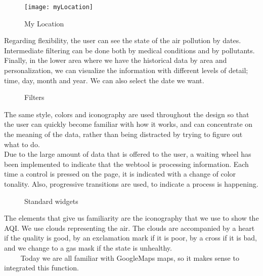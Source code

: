 \begin{figure}[ht]
    \centering
    \texttt{[image: myLocation]}
    \caption{My Location}
\end{figure}

Regarding flexibility, the user can see the state of the air pollution by dates. Intermediate filtering can be done both by medical conditions and by pollutants. Finally, in the lower area where we have
the historical data by area and personalization, we can visualize the information with different levels of detail; time, day, month and year. We can also
select the date we want.\\

\begin{figure}[ht]
    \centering
    \hfill
    \vfill
    \caption{Filters}
\end{figure}

The same style, colors and iconography are used throughout the design so that the user can quickly become familiar with how it works, and can
concentrate on the meaning of the data, rather than being distracted by trying to figure out what to do.\\

Due to the large amount of data that is offered to the user, a waiting wheel has been implemented to indicate
that the webtool is processing information. Each time a control is pressed on the page, it is indicated with a change
of color tonality. Also, progressive transitions are used, to indicate a process is happening.

\begin{figure}[ht]
    \centering
    \hfill
    \vfill
    \hfill
    \caption{Standard widgets}
\end{figure}

The elements that give us familiarity are the iconography that we use to show the AQI. We use clouds representing
the air. The clouds are accompanied by a heart if the quality is good, by an exclamation mark if it is poor, by a cross if it is
bad, and we change to a gas mask if the state is unhealthy.\\
    
Today we are all familiar with GoogleMaps maps, so it makes sense to integrated this function.      

